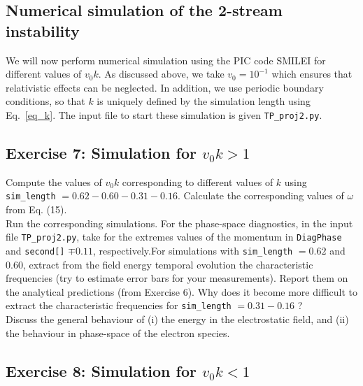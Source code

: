 \documentclass[11pt,a4paper]{article}
\begin{document}
\subsection*{Numerical simulation of the 2-stream instability}

We will now perform numerical simulation using the PIC code SMILEI for different values of $v_0 k$.
As discussed above, we take $v_0=10^{-1}$ which ensures that relativistic effects can be neglected.
In addition, we use periodic boundary conditions, so that $k$ is uniquely defined by the simulation length using Eq.~\eqref{eq_k}.
The input file to start these simulation is given \texttt{TP\_proj2.py}.

\subsection*{Exercise 7: Simulation for $v_0 k > 1$}

 Compute the values of $v_0 k$ corresponding to different values of $k$ using \\ \texttt{sim\_length} $= 0.62 - 0.60- 0.31 - 0.16$. Calculate the corresponding values of $\omega$ from Eq. (15).\\
 Run the corresponding simulations.  For the phase-space diagnostics, in the input file \texttt{TP\_proj2.py}, take for the extremes values of the momentum in \texttt{DiagPhase} and \texttt{second[]}  $\mp 0.11$, respectively.For simulations with \texttt{sim\_length} $= 0.62$ and $0.60$, extract from the field energy temporal evolution the characteristic frequencies (try to estimate error bars for your measurements). Report them on the analytical predictions (from Exercise 6). Why does it become more difficult to extract the characteristic frequencies for \texttt{sim\_length} $= 0.31 - 0.16$ ?\\
 Discuss the general behaviour of (i) the energy in the electrostatic field, and (ii) the behaviour in phase-space of the electron species. \\

\subsection*{Exercise 8: Simulation for $v_0 k < 1$}
\end{document}
